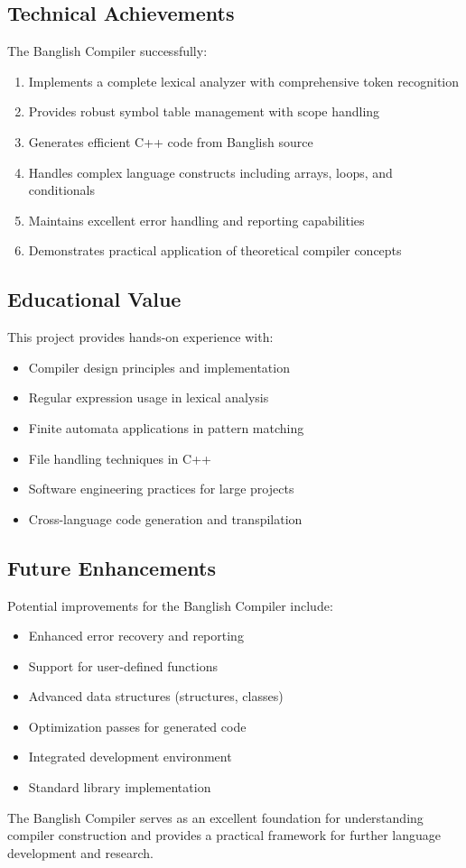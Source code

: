 \documentclass[12pt,a4paper]{article}
\begin{document}
\subsection{Technical Achievements}

The Banglish Compiler successfully:

\begin{enumerate}
    \item Implements a complete lexical analyzer with comprehensive token recognition
    \item Provides robust symbol table management with scope handling
    \item Generates efficient C++ code from Banglish source
    \item Handles complex language constructs including arrays, loops, and conditionals
    \item Maintains excellent error handling and reporting capabilities
    \item Demonstrates practical application of theoretical compiler concepts
\end{enumerate}

\subsection{Educational Value}

This project provides hands-on experience with:
\begin{itemize}
    \item Compiler design principles and implementation
    \item Regular expression usage in lexical analysis
    \item Finite automata applications in pattern matching
    \item File handling techniques in C++
    \item Software engineering practices for large projects
    \item Cross-language code generation and transpilation
\end{itemize}

\subsection{Future Enhancements}

Potential improvements for the Banglish Compiler include:
\begin{itemize}
    \item Enhanced error recovery and reporting
    \item Support for user-defined functions
    \item Advanced data structures (structures, classes)
    \item Optimization passes for generated code
    \item Integrated development environment
    \item Standard library implementation
\end{itemize}

The Banglish Compiler serves as an excellent foundation for understanding compiler construction and provides a practical framework for further language development and research.
\end{document}
